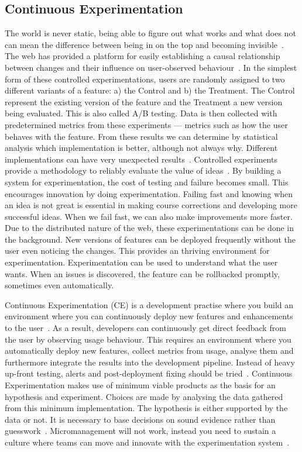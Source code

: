 \documentclass[english]{tktltiki2}
\begin{document}
\subsection{Continuous Experimentation}

The world is never static, being able to figure out what works and what does not can mean the difference between being in on the top and becoming invisible~\cite{KLS09}. The web has provided a platform for easily establishing a causal relationship between changes and their influence on user-observed behaviour~\cite{KLS09}. In the simplest form of these controlled experimentations, users are randomly assigned to two different variants of a feature: a) the Control and b) the Treatment. The Control represent the existing version of the feature and the Treatment a new version being evaluated. This is also called A/B testing. Data is then collected with predetermined metrics from these experiments — metrics such as how the user behaves with the feature. From these results we can determine by statistical analysis which implementation is better, although not always why. Different implementations can have very unexpected results~\cite{KLS09}. Controlled experiments provide a methodology to reliably evaluate the value of ideas~\cite{KLS09}. By building a system for experimentation, the cost of testing and failure becomes small. This encourages innovation by doing experimentation. Failing fast and knowing when an idea is not great is essential in making course corrections and developing more successful ideas. When we fail fast, we can also make improvements more faster. Due to the distributed nature of the web, these experimentations can be done in the background. New versions of features can be deployed frequently without the user even noticing the changes. This provides an thriving environment for experimentation. Experimentation can be used to understand what the user wants. When an issues is discovered, the feature can be rollbacked promptly, sometimes even automatically.

Continuous Experimentation (CE) is a development practise where you build an environment where you can continuously deploy new features and enhancements to the user~\cite{FGM14}. As a result, developers can continuously get direct feedback from the user by observing usage behaviour. This requires an environment where you automatically deploy new features, collect metrics from usage, analyse them and furthermore integrate the results into the development pipeline. Instead of heavy up-front testing, alerts and post-deployment fixing should be tried~\cite{FGM14}. Continuous Experimentation makes use of minimum viable products as the basis for an hypothesis and experiment. Choices are made by analysing the data gathered from this minimum implementation. The hypothesis is either supported by the data or not. It is necessary to base decisions on sound evidence rather than guesswork~\cite{FGM14}. Micromanagement will not work, instead you need to sustain a culture where teams can move and innovate with the experimentation system~\cite{Rie11}.
\end{document}

